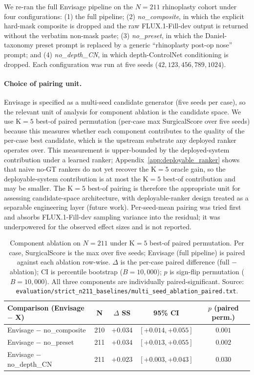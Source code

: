 \documentclass{article}
\newcommand{\method}{Envisage}
\begin{document}
We re-ran the full \method{} pipeline on the $N{=}211$ rhinoplasty
cohort under four configurations: (1) the full pipeline; (2) \emph{no\_composite},
in which the explicit hard-mask composite is dropped and the raw
FLUX.1-Fill-dev output is returned without the verbatim non-mask paste;
(3) \emph{no\_preset}, in which the Daniel-taxonomy preset prompt is
replaced by a generic ``rhinoplasty post-op nose'' prompt; and
(4) \emph{no\_depth\_CN}, in which depth-ControlNet conditioning is dropped.
Each configuration was run at five seeds ($42, 123, 456, 789, 1024$).

\paragraph{Choice of pairing unit.} \method{} is specified as a multi-seed
candidate generator (five seeds per case), so the relevant unit of analysis
for component ablation is the candidate space. We use K$=5$ best-of paired
permutation (per-case max SurgicalScore over five seeds) because this
measures whether each component contributes to the quality of the per-case
best candidate, which is the upstream substrate any deployed ranker
operates over. This measurement is upper-bounded by the deployed-system
contribution under a learned ranker;
Appendix~\ref{app:deployable_ranker} shows that naive no-GT rankers do not
yet recover the K$=5$ oracle gain, so the deployable-system contribution
is at most the K$=5$ best-of contribution and may be smaller. The
K$=5$ best-of pairing is therefore the appropriate unit for assessing
candidate-space architecture, with deployable-ranker design treated as
a separable engineering layer (future work).
Per-seed-mean pairing was tried first and absorbs FLUX.1-Fill-dev
sampling variance into the residual; it was underpowered for the observed
effect sizes and is not reported.

\begin{table}[h]
\centering
\small
\caption{Component ablation on $N{=}211$ under K$=5$ best-of paired
permutation. Per case, SurgicalScore is the max over five seeds; \method{}
(full pipeline) is paired against each ablation row-wise.
$\Delta$ is the per-case paired difference (full $-$ ablation);
CI is percentile bootstrap ($B{=}10{,}000$); $p$ is sign-flip permutation
($B{=}10{,}000$). All three components are individually paired-significant.
Source:
\texttt{evaluation/strict\_n211\_baselines/multi\_seed\_ablation\_paired.txt}.}
\label{tab:ablation}
\begin{tabular}{@{}lcccc@{}}
\toprule
\textbf{Comparison (\method{} $-$ X)} & \textbf{N} & \textbf{$\Delta$ SS} &
\textbf{95\% CI} & \textbf{$p$ (paired perm.)} \\
\midrule
\method{} $-$ no\_composite & 210 & $+0.034$ & $[+0.014, +0.055]$ & $0.001$ \\
\method{} $-$ no\_preset    & 211 & $+0.034$ & $[+0.013, +0.055]$ & $0.002$ \\
\method{} $-$ no\_depth\_CN & 211 & $+0.023$ & $[+0.003, +0.043]$ & $0.030$ \\
\bottomrule
\end{tabular}
\end{table}
\end{document}
